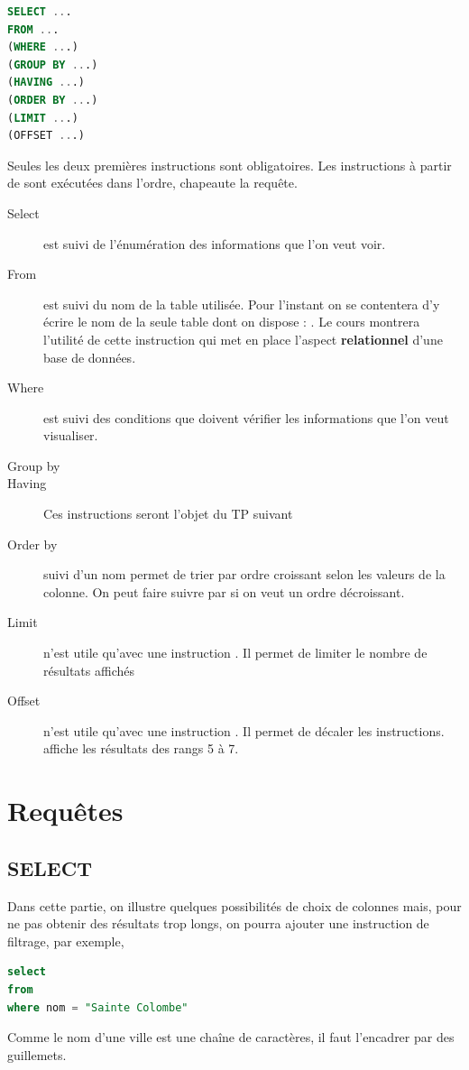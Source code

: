 \begin{lstlisting}[language=SQL]
SELECT ...
FROM ...
(WHERE ...)
(GROUP BY ...)
(HAVING ...)
(ORDER BY ...)
(LIMIT ...)
(OFFSET ...)
\end{lstlisting}

Seules les deux premières instructions sont obligatoires. Les instructions à partir de  sont exécutées dans l'ordre,  chapeaute la requête.

\begin{description}
    \item[Select] est suivi de l'énumération des informations que l'on veut voir.
    \item[From] est suivi du nom de la table utilisée. Pour l'instant on se contentera d'y écrire le nom de la seule table dont on dispose : . Le cours montrera l'utilité de cette instruction qui met en place l'aspect {\bf relationnel} d'une base de données.
    \item[Where] est suivi des conditions que doivent vérifier les informations que l'on veut visualiser. 
    \item[Group by] 
    \item[Having] Ces instructions seront l'objet du TP suivant
    \item[Order by] suivi d'un nom permet de trier par ordre croissant selon les valeurs de la colonne. On peut faire suivre par  si on veut un ordre décroissant.
    \item[Limit] n'est utile qu'avec une instruction . Il permet de limiter le nombre de résultats affichés
    \item[Offset] n'est utile qu'avec une instruction . Il permet de décaler les instructions.  affiche les résultats des rangs 5 à 7.
\end{description}

\newpage
\section{Requêtes}
\subsection{SELECT}
Dans cette partie, on illustre quelques possibilités de choix de colonnes mais, pour ne pas obtenir des résultats trop longs, on pourra ajouter une instruction de filtrage, par exemple,
\begin{lstlisting}[language=SQL]
select 
from 
where nom = "Sainte Colombe"
\end{lstlisting}
Comme le nom d'une ville est une chaîne de caractères, il faut l'encadrer par des guillemets.

